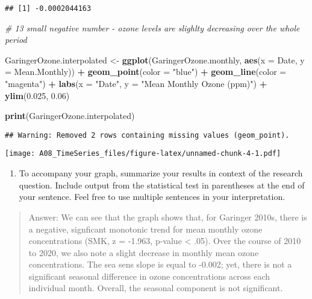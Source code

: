 \documentclass[]{article}
\newenvironment{Shaded}{\begin{snugshade}}{\end{snugshade}}
\newcommand{\CommentTok}[1]{\textcolor[rgb]{0.56,0.35,0.01}{\textit{#1}}}
\newcommand{\DataTypeTok}[1]{\textcolor[rgb]{0.13,0.29,0.53}{#1}}
\newcommand{\FloatTok}[1]{\textcolor[rgb]{0.00,0.00,0.81}{#1}}
\newcommand{\KeywordTok}[1]{\textcolor[rgb]{0.13,0.29,0.53}{\textbf{#1}}}
\newcommand{\NormalTok}[1]{#1}
\newcommand{\OperatorTok}[1]{\textcolor[rgb]{0.81,0.36,0.00}{\textbf{#1}}}
\newcommand{\StringTok}[1]{\textcolor[rgb]{0.31,0.60,0.02}{#1}}
\providecommand{\tightlist}{%
  \setlength{\itemsep}{0pt}\setlength{\parskip}{0pt}}
\begin{document}
\begin{verbatim}
## [1] -0.0002044163
\end{verbatim}

\begin{Shaded}
\begin{Highlighting}[]
\CommentTok{# 13 small negative number - ozone levels are slighlty decreasing over the whole period}

\NormalTok{GaringerOzone.interpolated <-}
\KeywordTok{ggplot}\NormalTok{(GaringerOzone.monthly, }\KeywordTok{aes}\NormalTok{(}\DataTypeTok{x =}\NormalTok{ Date, }\DataTypeTok{y =}\NormalTok{ Mean.Monthly)) }\OperatorTok{+}
\StringTok{  }\KeywordTok{geom_point}\NormalTok{(}\DataTypeTok{color =} \StringTok{"blue"}\NormalTok{) }\OperatorTok{+}
\StringTok{  }\KeywordTok{geom_line}\NormalTok{(}\DataTypeTok{color =} \StringTok{"magenta"}\NormalTok{) }\OperatorTok{+}
\StringTok{  }\KeywordTok{labs}\NormalTok{(}\DataTypeTok{x =} \StringTok{"Date"}\NormalTok{, }\DataTypeTok{y =} \StringTok{"Mean Monthly Ozone (ppm)"}\NormalTok{) }\OperatorTok{+}
\StringTok{  }\KeywordTok{ylim}\NormalTok{(}\FloatTok{0.025}\NormalTok{, }\FloatTok{0.06}\NormalTok{)}

\KeywordTok{print}\NormalTok{(GaringerOzone.interpolated)}
\end{Highlighting}
\end{Shaded}

\begin{verbatim}
## Warning: Removed 2 rows containing missing values (geom_point).
\end{verbatim}

\texttt{[image: A08\_TimeSeries\_files/figure-latex/unnamed-chunk-4-1.pdf]}

\begin{enumerate}
\def\labelenumi{\arabic{enumi}.}
\setcounter{enumi}{13}
\tightlist
\item
  To accompany your graph, summarize your results in context of the
  research question. Include output from the statistical test in
  parentheses at the end of your sentence. Feel free to use multiple
  sentences in your interpretation.
\end{enumerate}

\begin{quote}
Answer: We can see that the graph shows that, for Garinger 2010s, there
is a negative, signficant monotonic trend for mean monthly ozone
concentrations (SMK, z = -1.963, p-value \textless{} .05). Over the
course of 2010 to 2020, we also note a slight decrease in monthly mean
ozone concentrations. The sea sens slope is equal to -0.002; yet, there
is not a significant seasonal difference in ozone concentrations across
each individual month. Overall, the seasonal component is not
significant.
\end{quote}
\end{document}
